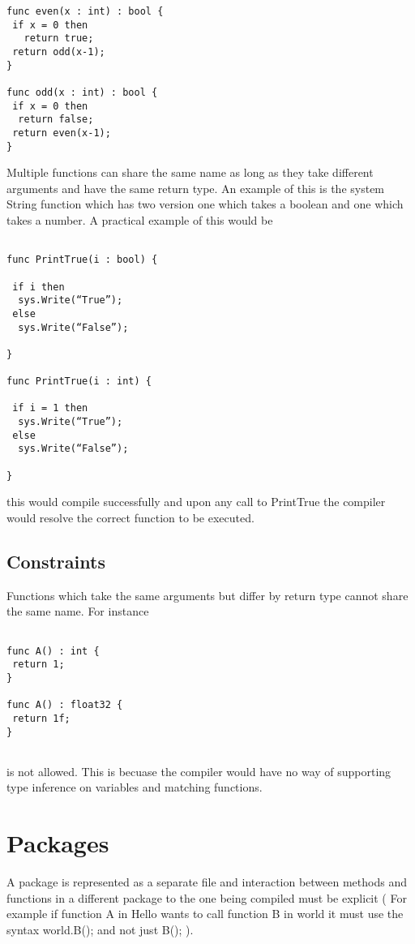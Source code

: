 \documentclass[]{final_report}
\begin{document}
\begin{verbatim}
func even(x : int) : bool {
 if x = 0 then 
   return true;
 return odd(x-1);
}

func odd(x : int) : bool {
 if x = 0 then 
  return false;
 return even(x-1);
}
\end{verbatim}

Multiple functions can share the same name as long as they take different arguments and have the same return type. An example of this is the system String function which has two version one which takes a boolean and one which takes a number. A practical example of this would be

\begin{verbatim}

func PrintTrue(i : bool) {

 if i then 
  sys.Write(“True”); 
 else 
  sys.Write(“False”);

}

func PrintTrue(i : int) {

 if i = 1 then
  sys.Write(“True”);
 else
  sys.Write(“False”);

}

\end{verbatim}

this would compile successfully and upon any call to PrintTrue the compiler would resolve the correct function to be executed.

\subsection{Constraints}

Functions which take the same arguments but differ by return type cannot share the same name. For instance

\begin{verbatim}

func A() : int {
 return 1;
}

func A() : float32 {
 return 1f;
}
 
\end{verbatim}

is not allowed. This is becuase the compiler would have no way of supporting type inference on variables and matching functions.

\section{Packages}

A package is represented as a separate file and interaction between methods and functions in a different package to the one being compiled must be explicit ( For example if function A in Hello wants to call function B in world it must use the syntax world.B(); and not just B(); ).
\end{document}
